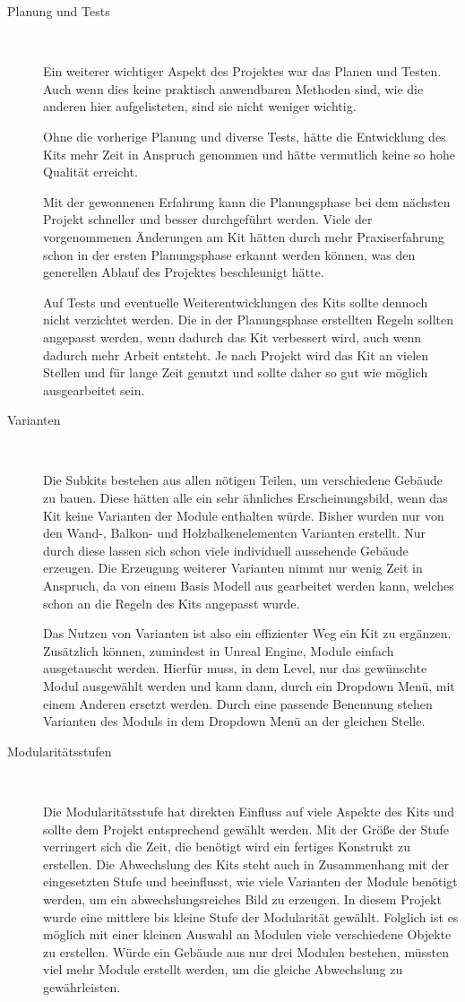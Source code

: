 \begin{description}
\item[Planung und Tests]~\par
Ein weiterer wichtiger Aspekt des Projektes war das Planen und Testen. Auch wenn dies keine praktisch anwendbaren Methoden sind, wie die anderen hier aufgelisteten, sind sie nicht weniger wichtig.
\par
Ohne die vorherige Planung und diverse Tests, hätte die Entwicklung des Kits mehr Zeit in Anspruch genommen und hätte vermutlich keine so hohe Qualität erreicht.
\par
Mit der gewonnenen Erfahrung kann die Planungsphase bei dem nächsten Projekt schneller und besser durchgeführt werden. Viele der vorgenommenen Änderungen am Kit hätten durch mehr Praxiserfahrung schon in der ersten Planungsphase erkannt werden können, was den generellen Ablauf des Projektes beschleunigt hätte.
\par
Auf Tests und eventuelle Weiterentwicklungen des Kits sollte dennoch nicht verzichtet werden. Die in der Planungsphase erstellten Regeln sollten angepasst werden, wenn dadurch das Kit verbessert wird, auch wenn dadurch mehr Arbeit entsteht. Je nach Projekt wird das Kit an vielen Stellen und für lange Zeit genutzt und sollte daher so gut wie möglich ausgearbeitet sein.
\item[Varianten]~\par
Die Subkits bestehen aus allen nötigen Teilen, um verschiedene Gebäude zu bauen. Diese hätten alle ein sehr ähnliches Erscheinungsbild, wenn das Kit keine Varianten der Module enthalten würde. Bisher wurden nur von den Wand-, Balkon- und Holzbalkenelementen Varianten erstellt. Nur durch diese lassen sich schon viele individuell aussehende Gebäude erzeugen. Die Erzeugung weiterer Varianten nimmt nur wenig Zeit in Anspruch, da von einem Basis Modell aus gearbeitet werden kann, welches schon an die Regeln des Kits angepasst wurde.
\par
Das Nutzen von Varianten ist also ein effizienter Weg ein Kit zu ergänzen. Zusätzlich können, zumindest in Unreal Engine, Module einfach ausgetauscht werden. Hierfür muss, in dem Level, nur das gewünschte Modul ausgewählt werden und kann dann, durch ein Dropdown Menü, mit einem Anderen ersetzt werden. Durch eine passende Benennung stehen Varianten des Moduls in dem Dropdown Menü an der gleichen Stelle.
\item[Modularitätsstufen]~\par
Die Modularitätsstufe hat direkten Einfluss auf viele Aspekte des Kits und sollte dem Projekt entsprechend gewählt werden. Mit der Größe der Stufe verringert sich die Zeit, die benötigt wird ein fertiges Konstrukt zu erstellen. Die Abwechslung des Kits steht auch in Zusammenhang mit der eingesetzten Stufe und beeinflusst, wie viele Varianten der Module benötigt werden, um ein abwechslungsreiches Bild zu erzeugen. In diesem Projekt wurde eine mittlere bis kleine Stufe der Modularität gewählt. Folglich ist es möglich mit einer kleinen Auswahl an Modulen viele verschiedene Objekte zu erstellen. Würde ein Gebäude aus nur drei Modulen bestehen, müssten viel mehr Module erstellt werden, um die gleiche Abwechslung zu gewährleisten.

\end{description}
